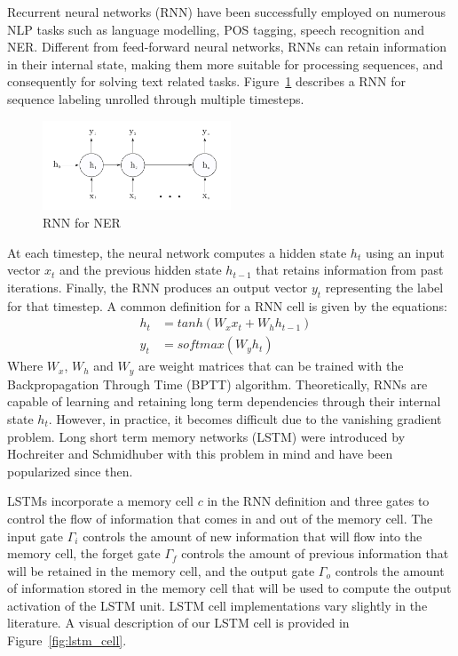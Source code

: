 \documentclass{nle}
\begin{document}
Recurrent neural networks (RNN) have been successfully employed on numerous NLP tasks such as
language modelling, POS tagging, speech recognition and NER. Different from feed-forward 
neural networks, RNNs can retain information in their internal state, making them more 
suitable for processing sequences, and consequently for solving text related tasks. 
Figure~\ref{fig:rnn_network} describes a RNN for sequence labeling unrolled through multiple 
timesteps. 
%
\begin{figure}[h]
  \centering
  \includegraphics[width=0.5\textwidth]{pics/rnn_network}
  \caption{RNN for NER}
  \label{fig:rnn_network}
\end{figure}
%
At each timestep, the neural network computes a hidden state $ h_t $ using an input 
vector $ x_t $ and the previous hidden state $ h_{t-1} $ that retains information from past 
iterations. Finally, the RNN produces an output vector $ y_t $ representing the label for that 
timestep. A common definition for a RNN cell is given by the equations:
%
\begin{align*}
h_t &= tanh(W_x x_t + W_h h_{t-1}) &\\
y_t &= softmax(W_y h_t) &
\end{align*}
%
Where $ W_x $, $ W_h $ and $ W_y $ are weight matrices that can be trained with the 
Backpropagation Through Time (BPTT) algorithm. Theoretically, RNNs are capable of learning
and retaining long term dependencies through their internal state $ h_t $. However, in practice,
it becomes difficult due to the vanishing gradient problem. Long short term memory networks (LSTM) were 
introduced by Hochreiter and Schmidhuber \cite{Hochreiter1997} with this problem in mind and 
have been popularized since then. 

LSTMs incorporate a memory cell $ c $ in the RNN definition and three gates to control 
the flow of information that comes in and out of the memory cell.
The input gate $ \Gamma_{i} $ controls the amount of new information that will flow into the memory cell,
the forget gate $ \Gamma_{f} $ controls the amount of previous information that will be retained in the memory
cell, and the output gate $ \Gamma_{o} $ controls the amount of information stored in the memory cell that
will be used to compute the output activation of the LSTM unit. 
LSTM cell implementations vary slightly in the literature. A visual description of 
our LSTM cell is provided in Figure~\ref{fig:lstm_cell}.
\end{document}
